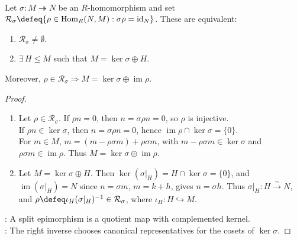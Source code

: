 \begin{proposition} \label{prop:split-epimorphism-modules} \\
Let $\sigma:M\twoheadrightarrow N$ be an $R$-homomorphism and set $\mathcal{R}_\sigma\defeq\{\rho\in\operatorname{Hom}_R(N,M):\sigma\rho=\operatorname{id}_N\}$. These are equivalent:
\begin{enumerate}[label=(\roman*)]
\setlength{\itemsep}{0pt}
\item $\mathcal{R}_\sigma\neq\emptyset$.
\item $\exists\,H\leq M$ such that $M=\ker\sigma\oplus H$.
\end{enumerate}
Moreover, $\rho\in\mathcal{R}_\sigma\Longrightarrow M=\ker\sigma\oplus\operatorname{im}\rho$.
\begin{proof}
\begin{enumerate}[label=\roman*.]
\setlength{\itemsep}{0pt}
\item[$(\Rightarrow)$] Let $\rho\in\mathcal{R}_\sigma$. If $\rho n=0$, then $n=\sigma\rho n=0$, so $\rho$ is injective.\\
If $\rho n\in\ker\sigma$, then $n=\sigma\rho n=0$, hence $\operatorname{im}\rho\cap\ker\sigma=\{0\}$.\\
For $m\in M$, $m=(m-\rho\sigma m)+\rho\sigma m$, with $m-\rho\sigma m\in\ker\sigma$ and $\rho\sigma m\in\operatorname{im}\rho$. Thus $M=\ker\sigma\oplus\operatorname{im}\rho$.
\item[$(\Leftarrow)$] Let $M=\ker\sigma\oplus H$. Then $\ker(\sigma|_H)=H\cap\ker\sigma=\{0\}$, and $\operatorname{im}(\sigma|_H)=N$ since $n=\sigma m$, $m=k+h$, gives $n=\sigma h$. Thus $\sigma|_H:H\xrightarrow{\sim}N$, and $\rho\defeq\iota_H(\sigma|_H)^{-1}\in\mathcal{R}_\sigma$, where $\iota_H:H\hookrightarrow M$.
\end{enumerate}
: A split epimorphism is a quotient map with complemented kernel.\\
: The right inverse chooses canonical representatives for the
cosets of $\ker\sigma$.
\end{proof}
\end{proposition}

